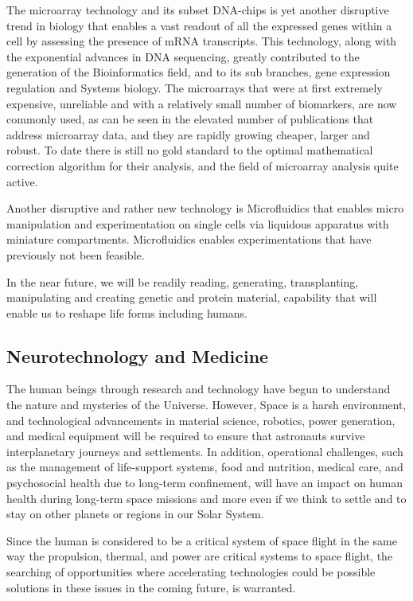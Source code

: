 \documentclass[letter,11pt]{article}
\begin{document}
The microarray technology and its subset DNA-chips is yet another disruptive
trend in biology that enables a vast readout of all the expressed genes within
a cell by assessing the presence of mRNA transcripts. This technology, along
with the exponential advances in DNA sequencing, greatly contributed to the
generation of the Bioinformatics field, and to its sub branches, gene
expression regulation and Systems biology. The microarrays that were at first
extremely expensive, unreliable and with a relatively small number of
biomarkers, are now commonly used, as can be seen in the elevated number of
publications that address microarray data, and they are rapidly growing
cheaper, larger and robust. To date there is still no gold standard to the
optimal mathematical correction algorithm for their analysis, and the field of
microarray analysis quite active.
 
Another disruptive and rather new technology is Microfluidics that enables
micro manipulation and experimentation on single cells via liquidous apparatus
with miniature compartments. Microfluidics enables experimentations that have
previously not been feasible.
 
In the near future, we will be readily reading, generating, transplanting,
manipulating and creating genetic and protein material, capability that will
enable us to reshape life forms including humans.
 

\subsection{Neurotechnology and Medicine}
\label{et-neuro}

The human beings through research and technology have begun to understand the
nature and mysteries of the Universe. However, Space is a harsh environment,
and technological advancements in material science, robotics, power generation,
and medical equipment will be required to ensure that astronauts survive
interplanetary journeys and settlements. In addition, operational challenges,
such as the management of life-support systems, food and nutrition, medical
care, and psychosocial health due to long-term confinement, will have an impact
on human health during long-term space missions and more even if we think to
settle and to stay on other planets or regions in our Solar System.
 
Since the human is considered to be a critical system of space flight in the
same way the propulsion, thermal, and power are critical systems to space
flight, the searching of opportunities where accelerating technologies could be
possible solutions in these issues in the coming future, is warranted.
 
\end{document}
